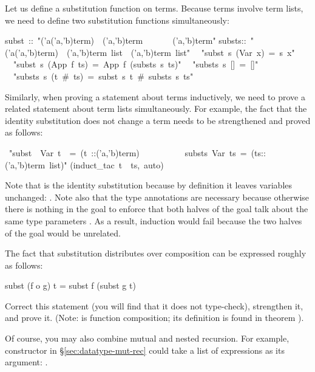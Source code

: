 \begin{isabelle}
\begin{isamarkuptext}
Let us define a substitution function on terms. Because terms involve term
lists, we need to define two substitution functions simultaneously:%
\end{isamarkuptext}%
\isanewline
subst\ ::\ {"}('a{\isasymRightarrow}('a,'b)term)\ {\isasymRightarrow}\ ('a,'b)term\ \ \ \ \ \ {\isasymRightarrow}\ ('a,'b)term{"}\isanewline
substs::\ {"}('a{\isasymRightarrow}('a,'b)term)\ {\isasymRightarrow}\ ('a,'b)term\ list\ {\isasymRightarrow}\ ('a,'b)term\ list{"}\isanewline
\isanewline
{}\isanewline
\ \ {"}subst\ s\ (Var\ x)\ =\ s\ x{"}\isanewline
\ \ {"}subst\ s\ (App\ f\ ts)\ =\ App\ f\ (substs\ s\ ts){"}\isanewline
\isanewline
\ \ {"}substs\ s\ []\ =\ []{"}\isanewline
\ \ {"}substs\ s\ (t\ \#\ ts)\ =\ subst\ s\ t\ \#\ substs\ s\ ts{"}%
\begin{isamarkuptext}%
\noindent
Similarly, when proving a statement about terms inductively, we need
to prove a related statement about term lists simultaneously. For example,
the fact that the identity substitution does not change a term needs to be
strengthened and proved as follows:%
\end{isamarkuptext}%
\ {"}subst\ \ Var\ t\ \ =\ (t\ ::('a,'b)term)\ \ {\isasymand}\isanewline
\ \ \ \ \ \ \ \ substs\ Var\ ts\ =\ (ts::('a,'b)term\ list){"}\isanewline
{}(induct\_tac\ t\ \ ts,\ auto)%
\begin{isamarkuptext}%
\noindent
Note that  is the identity substitution because by definition it
leaves variables unchanged: . Note also
that the type annotations are necessary because otherwise there is nothing in
the goal to enforce that both halves of the goal talk about the same type
parameters . As a result, induction would fail
because the two halves of the goal would be unrelated.

\begin{exercise}
The fact that substitution distributes over composition can be expressed
roughly as follows:
\begin{ttbox}
subst (f o g) t = subst f (subst g t)
\end{ttbox}
Correct this statement (you will find that it does not type-check),
strengthen it, and prove it. (Note:  is function composition;
its definition is found in theorem ).
\end{exercise}

Of course, you may also combine mutual and nested recursion. For example,
constructor  in \S\ref{sec:datatype-mut-rec} could take a list of
expressions as its argument: .%
\end{isamarkuptext}%
\end{isabelle}%
